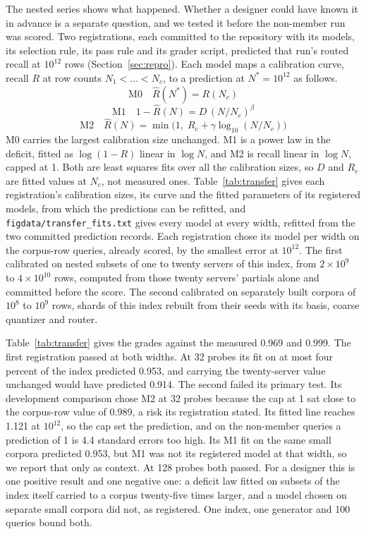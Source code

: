 \documentclass[sigconf, nonacm]{acmart}
\begin{document}
The nested series shows what happened. Whether a designer could have known it in advance is a
separate question, and we tested it before the non-member run was scored. Two registrations, each
committed to the repository with its models, its selection rule, its pass rule and its grader
script, predicted that run's routed recall at $10^{12}$ rows (Section~\ref{sec:repro}). Each
model maps a calibration curve, recall $R$ at row counts $N_1 < \dots < N_c$, to a prediction at
$N^{*} = 10^{12}$ as follows.
\begin{equation}\label{eq:m0}
\mathrm{M0}\quad \hat R(N^{*}) = R(N_c)
\end{equation}
\begin{equation}\label{eq:m1}
\mathrm{M1}\quad 1 - \hat R(N) = D\,(N/N_c)^{\beta}
\end{equation}
\begin{equation}\label{eq:m2}
\mathrm{M2}\quad \hat R(N) = \min\bigl(1,\; R_c + \gamma \log_{10}(N/N_c)\bigr)
\end{equation}
M0 carries the largest calibration size unchanged. M1 is a power law in the deficit, fitted as
$\log(1-R)$ linear in $\log N$, and M2 is recall linear in $\log N$, capped at 1. Both are least
squares fits over all the calibration sizes, so $D$ and $R_c$ are fitted values at $N_c$, not
measured ones. Table~\ref{tab:transfer} gives each registration's calibration sizes, its curve and
the fitted parameters of its registered models, from which the predictions can be refitted, and
\texttt{figdata/transfer\_fits.txt} gives every model at every width, refitted from the two
committed prediction records. Each registration chose its model per
width on the corpus-row queries, already scored, by the smallest error at $10^{12}$. The first
calibrated on nested subsets of one to twenty servers of this index, from $2\times10^{9}$ to
$4\times10^{10}$ rows, computed from those twenty servers' partials alone and committed before
the score. The second calibrated on separately built corpora of $10^{8}$ to $10^{9}$ rows, shards
of this index rebuilt from their seeds with its basis, coarse quantizer and router.

Table~\ref{tab:transfer} gives the grades against the measured 0.969 and 0.999. The first
registration passed at both widths. At 32 probes its fit on at most four percent of the index
predicted 0.953, and carrying the twenty-server value unchanged would have predicted 0.914. The
second failed its primary test. Its development comparison chose M2 at 32 probes because the cap
at 1 sat close to the corpus-row value of 0.989, a risk its registration stated. Its fitted line
reaches 1.121 at $10^{12}$, so the cap set the prediction, and on the non-member queries a
prediction of 1 is 4.4 standard errors too high. Its M1 fit on the same small
corpora predicted 0.953, but M1 was not its registered model at that width, so we report that only
as context. At 128 probes both passed. For a designer this is one positive result and one negative
one: a deficit law fitted on subsets of the index itself carried to a corpus
twenty-five times larger,
and a model chosen on separate small corpora did not, as registered. One index, one generator and
100 queries bound both.
\end{document}
